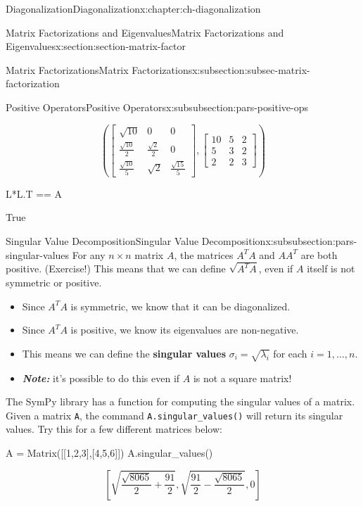 \documentclass[oneside,10pt,]{book}
\newcommand{\mono}[1]{\texttt{#1}}
\newcommand{\alert}[1]{\textbf{\textit{#1}}}
\newcommand{\terminology}[1]{\textbf{#1}}
\numberwithin{equation}{section}
\newcommand{\bbm}{\begin{bmatrix}}
\newcommand{\ebm}{\end{bmatrix}}
\newcommand{\amp}{&}
\begin{document}
\begin{chapterptx}{Diagonalization}{}{Diagonalization}{}{}{x:chapter:ch-diagonalization}
\begin{sectionptx}{Matrix Factorizations and Eigenvalues}{}{Matrix Factorizations and Eigenvalues}{}{}{x:section:section-matrix-factor}
\begin{subsectionptx}{Matrix Factorizations}{}{Matrix Factorizations}{}{}{x:subsection:subsec-matrix-factorization}
\begin{subsubsectionptx}{Positive Operators}{}{Positive Operators}{}{}{x:subsubsection:pars-positive-ops}
\begin{sageoutput}
\[\left(\bbm \sqrt{10}\amp 0\amp 0\\ \frac{\sqrt{10}}{2} \amp \frac{\sqrt{2}}{2} \amp 0\\\frac{\sqrt{10}}{5} \amp \sqrt{2}\amp \frac{\sqrt{15}}{5}\ebm, \bbm 10\amp 5\amp 2\\ 5\amp 3\amp 2\\ 2\amp 2\amp 3\ebm\right)\]
\end{sageoutput}
\begin{sageinput}
L*L.T == A
\end{sageinput}
\begin{sageoutput}
True
\end{sageoutput}
\end{subsubsectionptx}
%
%
\typeout{************************************************}
\typeout{************************************************}
%
\begin{subsubsectionptx}{Singular Value Decomposition}{}{Singular Value Decomposition}{}{}{x:subsubsection:pars-singular-values}
For any \(n\times n\) matrix \(A\), the matrices \(A^TA\) and \(AA^T\) are both positive. (Exercise!) This means that we can define \(\sqrt{A^TA}\), even if \(A\) itself is not symmetric or positive.%
\par
%
\begin{itemize}[label=\textbullet]
\item{}Since \(A^TA\) is symmetric, we know that it can be diagonalized.%
\item{}Since \(A^TA\) is positive, we know its eigenvalues are non-negative.%
\item{}This means we can define the \terminology{singular values} \(\sigma_i = \sqrt{\lambda_i}\) for each \(i=1,\ldots, n\).%
\item{}\alert{Note:} it's possible to do this even if \(A\) is not a square matrix!%
\end{itemize}
%
\par
The SymPy library has a function for computing the singular values of a matrix. Given a matrix \mono{A}, the command \mono{A.singular\_values()} will return its singular values. Try this for a few different matrices below:%
\begin{sageinput}
A = Matrix([[1,2,3],[4,5,6]])
A.singular_values()
\end{sageinput}
\begin{sageoutput}
\[\left[\sqrt{\frac{\sqrt{8065}}{2}+\frac{91}{2}},\sqrt{\frac{91}{2}-\frac{\sqrt{8065}}{2}},0\right]\]
\end{sageoutput}

\end{subsubsectionptx}
\end{subsectionptx}
\end{sectionptx}
\end{chapterptx}
\end{document}
